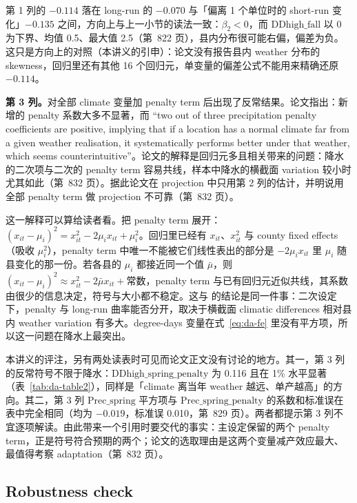 第 1 列的 $-0.114$ 落在 long-run 的 $-0.070$ 与「偏离 1 个单位时的 short-run 变化」$-0.135$ 之间，方向上与上一小节的读法一致：$\beta_2<0$，而 $\mathrm{DDhigh\_fall}$ 以 0 为下界、均值 0.5、最大值 2.5（第~822 页），县内分布很可能右偏，偏差为负。这只是方向上的对照（本讲义的引申）：论文没有报告县内 weather 分布的 skewness，回归里还有其他 16 个回归元，单变量的偏差公式不能用来精确还原 $-0.114$。

\textbf{第 3 列。}对全部 climate 变量加 penalty term 后出现了反常结果。论文指出：新增的 penalty 系数大多不显著，而 ``two out of three precipitation penalty coefficients are positive, implying that if a location has a normal climate far from a given weather realisation, it systematically performs better under that weather, which seems counterintuitive''\citep[第~832 页]{da2024climate}。论文的解释是回归元多且相关带来的问题：降水的二次项与二次的 penalty term 容易共线，样本中降水的横截面 variation 较小时尤其如此（第~832 页）。据此论文在 projection 中只用第 2 列的估计，并明说用全部 penalty term 做 projection 不可靠（第~832 页）。

这一解释可以算给读者看。把 penalty term 展开：$(x_{it}-\mu_i)^2=x_{it}^2-2\mu_i x_{it}+\mu_i^2$。回归里已经有 $x_{it}$、$x_{it}^2$ 与 county fixed effects（吸收 $\mu_i^2$），penalty term 中唯一不能被它们线性表出的部分是 $-2\mu_i x_{it}$ 里 $\mu_i$ 随县变化的那一份。若各县的 $\mu_i$ 都接近同一个值 $\bar\mu$，则 $(x_{it}-\mu_i)^2\approx x_{it}^2-2\bar\mu x_{it}+\text{常数}$，penalty term 与已有回归元近似共线，其系数由很少的信息决定，符号与大小都不稳定。这与  的结论是同一件事：二次设定下，penalty 与 long-run 曲率能否分开，取决于横截面 climatic differences 相对县内 weather variation 有多大。degree-days 变量在式~\ref{eq:da-fe} 里没有平方项，所以这一问题在降水上最突出。

本讲义的评注，另有两处读表时可见而论文正文没有讨论的地方。其一，第 3 列的反常符号不限于降水：$\mathrm{DDhigh\_spring\_penalty}$ 为 0.116 且在 1\% 水平显著（表~\ref{tab:da-table2}），同样是「climate 离当年 weather 越远、单产越高」的方向。其二，第 3 列 $\mathrm{Prec\_spring}$ 平方项与 $\mathrm{Prec\_spring\_penalty}$ 的系数和标准误在表中完全相同（均为 $-0.019$，标准误 0.010，第~829 页）。两者都提示第 3 列不宜逐项解读。由此带来一个引用时要交代的事实：主设定保留的两个 penalty term，正是符号符合预期的两个；论文的选取理由是这两个变量减产效应最大、最值得考察 adaptation（第~832 页）。

\subsection{Robustness check}


